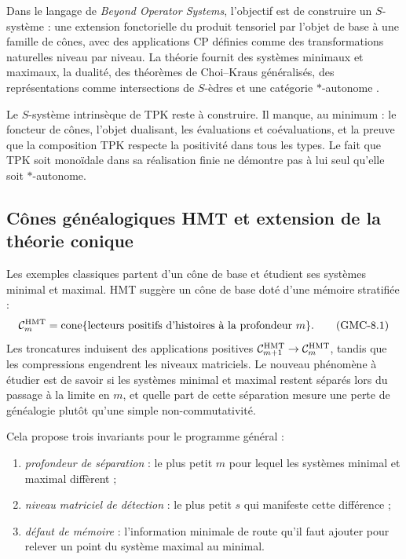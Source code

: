 Dans le langage de \emph{Beyond Operator Systems}, l'objectif est de construire un
$S$-système : une extension fonctorielle du produit tensoriel par l'objet de base
à une famille de cônes, avec des applications CP définies comme des transformations
naturelles niveau par niveau. La théorie fournit des systèmes minimaux et maximaux,
la dualité, des théorèmes de Choi--Kraus généralisés, des représentations comme
intersections de $S$-èdres et une catégorie $*$-autonome
\citep{delescoves2026beyond}.

\begin{workbox}
Le $S$-système intrinsèque de TPK reste à construire. Il manque, au minimum : le
foncteur de cônes, l'objet dualisant, les évaluations et coévaluations, et la
preuve que la composition TPK respecte la positivité dans tous les types.
Le fait que TPK soit monoïdale dans sa réalisation finie ne démontre pas à lui
seul qu'elle soit $*$-autonome.
\end{workbox}

\subsection{Cônes généalogiques HMT et extension de la théorie conique}

Les exemples classiques partent d'un cône de base et étudient ses systèmes minimal et
maximal. HMT suggère un cône de base doté d'une mémoire stratifiée :
\[
 \mathcal C_m^{\rm HMT}
 =\operatorname{cone}\{\text{lecteurs positifs d'histoires à la profondeur }m\}.
 \tag{GMC-8.1}
\]
Les troncatures induisent des applications positives
$\mathcal C_{m+1}^{\rm HMT}\to\mathcal C_m^{\rm HMT}$, tandis que les
compressions engendrent les niveaux matriciels. Le nouveau phénomène à étudier est
de savoir si les systèmes minimal et maximal restent séparés lors du passage à la limite en
$m$, et quelle part de cette séparation mesure une perte de généalogie plutôt qu'une simple
non-commutativité.

Cela propose trois invariants pour le programme général :

\begin{enumerate}
 \item \emph{profondeur de séparation} : le plus petit $m$ pour lequel les systèmes
 minimal et maximal diffèrent ;
 \item \emph{niveau matriciel de détection} : le plus petit $s$ qui manifeste cette
 différence ;
 \item \emph{défaut de mémoire} : l'information minimale de route qu'il faut
 ajouter pour relever un point du système maximal au minimal.
\end{enumerate}

